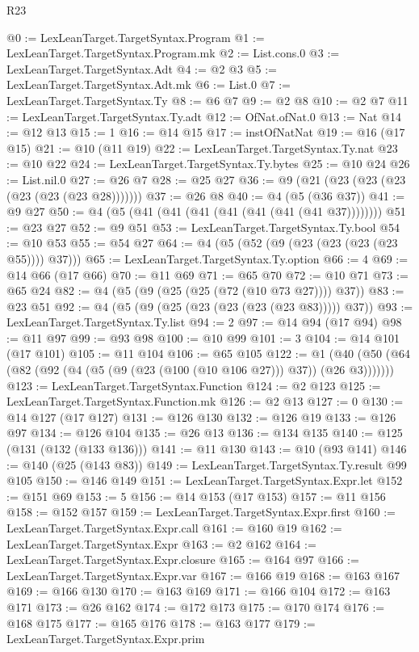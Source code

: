 \begin{lexlean}{R23}
\begin{coremodule}
@0 := LexLeanTarget.TargetSyntax.Program
@1 := LexLeanTarget.TargetSyntax.Program.mk
@2 := List.cons.{0}
@3 := LexLeanTarget.TargetSyntax.Adt
@4 := @2 @3
@5 := LexLeanTarget.TargetSyntax.Adt.mk
@6 := List.{0}
@7 := LexLeanTarget.TargetSyntax.Ty
@8 := @6 @7
@9 := @2 @8
@10 := @2 @7
@11 := LexLeanTarget.TargetSyntax.Ty.adt
@12 := OfNat.ofNat.{0}
@13 := Nat
@14 := @12 @13
@15 := 1
@16 := @14 @15
@17 := instOfNatNat
@19 := @16 (@17 @15)
@21 := @10 (@11 @19)
@22 := LexLeanTarget.TargetSyntax.Ty.nat
@23 := @10 @22
@24 := LexLeanTarget.TargetSyntax.Ty.bytes
@25 := @10 @24
@26 := List.nil.{0}
@27 := @26 @7
@28 := @25 @27
@36 := @9 (@21 (@23 (@23 (@23 (@23 (@23 (@23 @28)))))))
@37 := @26 @8
@40 := @4 (@5 (@36 @37))
@41 := @9 @27
@50 := @4 (@5 (@41 (@41 (@41 (@41 (@41 (@41 (@41 @37))))))))
@51 := @23 @27
@52 := @9 @51
@53 := LexLeanTarget.TargetSyntax.Ty.bool
@54 := @10 @53
@55 := @54 @27
@64 := @4 (@5 (@52 (@9 (@23 (@23 (@23 (@23 @55)))) @37)))
@65 := LexLeanTarget.TargetSyntax.Ty.option
@66 := 4
@69 := @14 @66 (@17 @66)
@70 := @11 @69
@71 := @65 @70
@72 := @10 @71
@73 := @65 @24
@82 := @4 (@5 (@9 (@25 (@25 (@72 (@10 @73 @27)))) @37))
@83 := @23 @51
@92 := @4 (@5 (@9 (@25 (@23 (@23 (@23 (@23 @83))))) @37))
@93 := LexLeanTarget.TargetSyntax.Ty.list
@94 := 2
@97 := @14 @94 (@17 @94)
@98 := @11 @97
@99 := @93 @98
@100 := @10 @99
@101 := 3
@104 := @14 @101 (@17 @101)
@105 := @11 @104
@106 := @65 @105
@122 := @1 (@40 (@50 (@64 (@82 (@92 (@4 (@5 (@9 (@23 (@100 (@10 @106 @27))) @37)) (@26 @3)))))))
@123 := LexLeanTarget.TargetSyntax.Function
@124 := @2 @123
@125 := LexLeanTarget.TargetSyntax.Function.mk
@126 := @2 @13
@127 := 0
@130 := @14 @127 (@17 @127)
@131 := @126 @130
@132 := @126 @19
@133 := @126 @97
@134 := @126 @104
@135 := @26 @13
@136 := @134 @135
@140 := @125 (@131 (@132 (@133 @136)))
@141 := @11 @130
@143 := @10 (@93 @141)
@146 := @140 (@25 (@143 @83))
@149 := LexLeanTarget.TargetSyntax.Ty.result @99 @105
@150 := @146 @149
@151 := LexLeanTarget.TargetSyntax.Expr.let
@152 := @151 @69
@153 := 5
@156 := @14 @153 (@17 @153)
@157 := @11 @156
@158 := @152 @157
@159 := LexLeanTarget.TargetSyntax.Expr.first
@160 := LexLeanTarget.TargetSyntax.Expr.call
@161 := @160 @19
@162 := LexLeanTarget.TargetSyntax.Expr
@163 := @2 @162
@164 := LexLeanTarget.TargetSyntax.Expr.closure
@165 := @164 @97
@166 := LexLeanTarget.TargetSyntax.Expr.var
@167 := @166 @19
@168 := @163 @167
@169 := @166 @130
@170 := @163 @169
@171 := @166 @104
@172 := @163 @171
@173 := @26 @162
@174 := @172 @173
@175 := @170 @174
@176 := @168 @175
@177 := @165 @176
@178 := @163 @177
@179 := LexLeanTarget.TargetSyntax.Expr.prim

\end{coremodule}
\end{lexlean}
